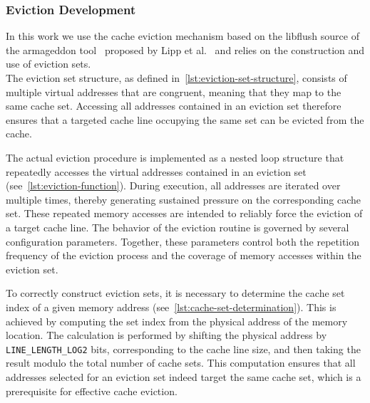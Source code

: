     \subsubsection{Eviction Development} \label{subsubsec:eviction-development}
        In this work we use the cache eviction mechanism based on the libflush source of the armageddon tool~\cite{toolArmageddon} proposed by Lipp et al.~\cite{paperARMageddon} and relies on the 
        construction and use of eviction sets. 
        \\
        The eviction set structure, as defined in~\cref{lst:eviction-set-structure}, consists of multiple virtual 
        addresses that are congruent, meaning that they map to the same cache set. Accessing all addresses contained 
        in an eviction set therefore ensures that a targeted cache line occupying the same set can be evicted from the cache.
        

        The actual eviction procedure is implemented as a nested loop structure that repeatedly accesses the virtual 
        addresses contained in an eviction set (see~\cref{lst:eviction-function}). During execution, 
        all addresses are iterated over multiple times, thereby generating sustained pressure on the corresponding cache set. 
        These repeated memory accesses are intended to reliably force the eviction of a target cache line. The behavior 
        of the eviction routine is governed by several configuration parameters. Together, these 
        parameters control both the repetition frequency of the eviction process and the coverage of memory accesses 
        within the eviction set.
        

        To correctly construct eviction sets, it is necessary to determine the cache set index of a given memory 
        address (see~\cref{lst:cache-set-determination}). This is achieved by computing the set index from the 
        physical address of the memory location. The calculation is performed by shifting the physical address by 
        \texttt{LINE\_LENGTH\_LOG2} bits, corresponding to the cache line size, and then taking the result modulo 
        the total number of cache sets. This computation ensures that all addresses selected for an eviction set 
        indeed target the same cache set, which is a prerequisite for effective cache eviction.
        

